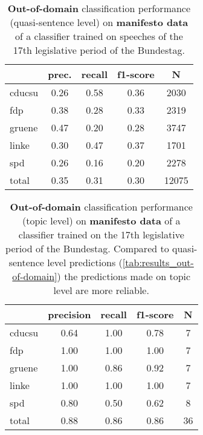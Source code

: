 \documentclass[11pt]{article}
\begin{document}
\begin{table}[t]
\caption{
\label{tab:results_out-of-domain}
{\bf Out-of-domain} classification performance (quasi-sentence level) on {\bf manifesto data} of a classifier trained on speeches of the 17th legislative period of the Bundestag.
}

\begin{center}
\begin{tabular}{lcccc}
    &         prec.    &recall &  f1-score  & N  \\
\hline \hline
    cducsu    &   0.26   &   0.58   &   0.36    &   2030 \\
    fdp    &   0.38   &   0.28   &   0.33    &   2319 \\
     gruene   &    0.47    &  0.20   &   0.28    &  3747\\
      linke     &  0.30  &    0.47    &  0.37    &   1701\\
        spd     &  0.26  &    0.16   &   0.20    &   2278\\
\hline
total    &   0.35  &    0.31  &    0.30   &   12075\\
%
\end{tabular}
\end{center}

\end{table}

\begin{table}[t]
\caption{
\label{tab:results_topic}
{\bf Out-of-domain} classification performance (topic level) on {\bf manifesto data} of a classifier trained on the 17th legislative period of the Bundestag. Compared to quasi-sentence level predictions (\autoref{tab:results_out-of-domain}) the predictions made on topic level are more reliable.}
\begin{center}
\begin{tabular}{lcccc}
    &         precision    &recall &  f1-score  & N  \\
    \hline
        \hline
cducsu     &  0.64  &    1.00  &    0.78    &     7\\
       fdp    &   1.00    &  1.00    &  1.00    &     7\\
    gruene  &     1.00  &    0.86  &    0.92    &     7\\
     linke    &   1.00   &   1.00     & 1.00    &     7\\
       spd   &    0.80   &   0.50    &  0.62     &    8\\
    \hline
total  &     0.88   &   0.86   &   0.86  &      36\\
\end{tabular}
\end{center}

\end{table}
\end{document}
